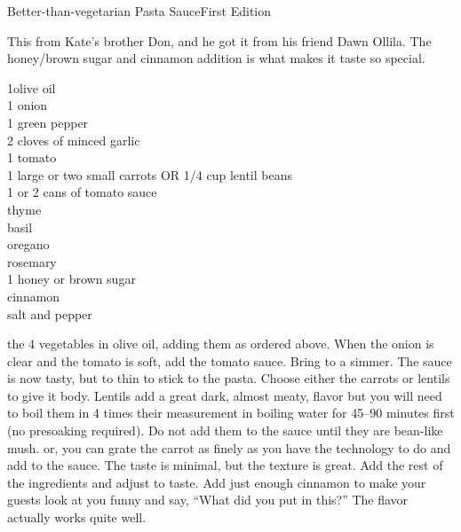 \begin{entry}{Better-than-vegetarian Pasta Sauce}{First Edition}

\begin{open}
  This from Kate's brother Don, and he got it from his friend Dawn Ollila. The honey/brown sugar and cinnamon addition is what makes it taste so special.
\end{open}
\begin{ingredients}
  \SI{1}{\tblspoon}olive oil \\
  1 onion \\
  1 green pepper \\
  2 cloves of minced garlic \\
  1 tomato\\
  1 large or two small carrots OR \SI{1/4}{\cup} cup lentil beans \\
  1 or 2 cans of tomato sauce \\
  thyme \\
  basil \\
  oregano \\
  rosemary \\
  \SI{1}{\tblspoon} honey or brown sugar \\
  cinnamon \\
  salt and pepper
\end{ingredients}
\Saute the 4 vegetables in olive oil, adding them as ordered above. When the
onion is clear and the tomato is soft, add the tomato sauce.  Bring to a
simmer. The sauce is now tasty, but to thin to stick to the pasta.  Choose
either the carrots or lentils to give it body. Lentils add a great dark,
almost meaty, flavor but you will need to boil them in 4 times their
measurement in boiling water for \numrange{45}{90} minutes first (no
presoaking required). Do not add them to the sauce until they are bean-like
mush. or, you can grate the carrot as finely as you have the technology to do
and add to the sauce. The taste is minimal, but the texture is great. Add the
rest of the ingredients and adjust to taste. Add just enough cinnamon to make
your guests look at you funny and say, ``What did you put in this?'' The
flavor actually works quite well.
\end{entry}

